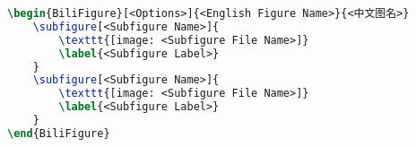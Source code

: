 \begin{lstlisting}[language=LaTeX, caption=Bilingual Subfigure, label=listing:bilingual-subfigure]
\begin{BiliFigure}[<Options>]{<English Figure Name>}{<中文图名>}
    \subfigure[<Subfigure Name>]{
        \texttt{[image: <Subfigure File Name>]}
        \label{<Subfigure Label>}
    }
    \subfigure[<Subfigure Name>]{
        \texttt{[image: <Subfigure File Name>]}
        \label{<Subfigure Label>}
    }
\end{BiliFigure}
\end{lstlisting}